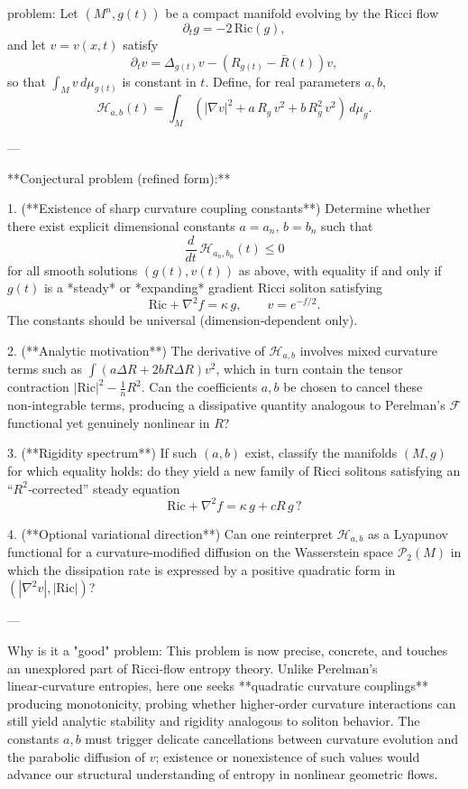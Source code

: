 problem:  
Let \((M^n,g(t))\) be a compact manifold evolving by the Ricci flow
\[
\partial_t g = -2\,\mathrm{Ric}(g),
\]
and let \(v=v(x,t)\) satisfy
\[
\partial_t v = \Delta_{g(t)}v - (R_{g(t)}-\bar R(t))v,
\]
so that \(\int_M v\,d\mu_{g(t)}\) is constant in \(t\).  Define, for real parameters \(a,b\),
\[
\mathcal{H}_{a,b}(t) = \int_M \left(|\nabla v|^2 + a\,R_g\,v^2 + b\,R_g^2\,v^2\right)\,d\mu_g.
\]

---

**Conjectural problem (refined form):**

1. (**Existence of sharp curvature coupling constants**)  
   Determine whether there exist explicit dimensional constants \(a=a_n\), \(b=b_n\) such that  
   \[
   \frac{d}{dt}\,\mathcal{H}_{a_n,b_n}(t)\le 0
   \]
   for all smooth solutions \((g(t),v(t))\) as above, with equality if and only if \(g(t)\) is a *steady* or *expanding* gradient Ricci soliton satisfying  
   \[
   \mathrm{Ric} + \nabla^2 f = \kappa\,g, \qquad v=e^{-f/2}.
   \]
   The constants should be universal (dimension‑dependent only).

2. (**Analytic motivation**)  
   The derivative of \(\mathcal{H}_{a,b}\) involves mixed curvature terms such as \(\int (a\Delta R + 2bR\Delta R)v^2\), which in turn contain the tensor contraction \(|\mathrm{Ric}|^2-\tfrac{1}{n}R^2\).  Can the coefficients \(a,b\) be chosen to cancel these non‑integrable terms, producing a dissipative quantity analogous to Perelman’s \(\mathcal{F}\) functional yet genuinely nonlinear in \(R\)?

3. (**Rigidity spectrum**)  
   If such \((a,b)\) exist, classify the manifolds \((M,g)\) for which equality holds: do they yield a new family of Ricci solitons satisfying an “\(R^2\)‑corrected” steady equation  
   \[
   \mathrm{Ric}+\nabla^2 f = \kappa\,g + cR\,g\,?
   \]

4. (**Optional variational direction**)  
   Can one reinterpret \(\mathcal{H}_{a,b}\) as a Lyapunov functional for a curvature‑modified diffusion on the Wasserstein space \(\mathcal{P}_2(M)\) in which the dissipation rate is expressed by a positive quadratic form in \((|\nabla^2v|,|\mathrm{Ric}|)\)?  

---

Why is it a "good" problem:  
This problem is now precise, concrete, and touches an unexplored part of Ricci‑flow entropy theory.  Unlike Perelman’s linear‑curvature entropies, here one seeks **quadratic curvature couplings** producing monotonicity, probing whether higher‑order curvature interactions can still yield analytic stability and rigidity analogous to soliton behavior.  The constants \(a,b\) must trigger delicate cancellations between curvature evolution and the parabolic diffusion of \(v\); existence or nonexistence of such values would advance our structural understanding of entropy in nonlinear geometric flows.

